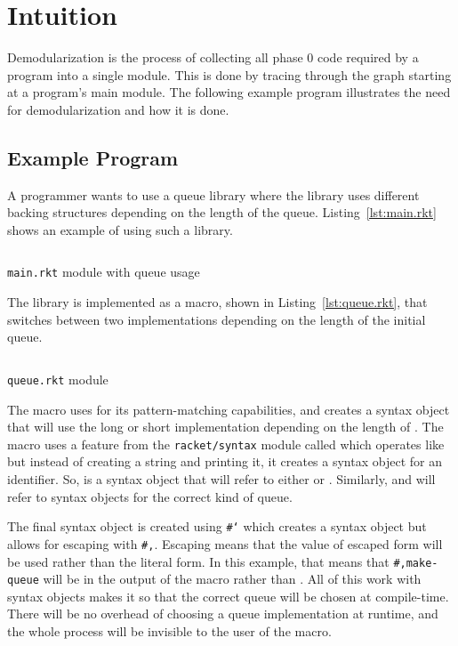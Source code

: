 \chapter{Intuition}
\label{chap:intuition}
Demodularization is the process of collecting all phase 0 code required by a program into a single module.
This is done by tracing through the  graph starting at a program's main module.
The following example program illustrates the need for demodularization and how it is done.

\section{Example Program}
A programmer wants to use a queue library where the library uses different backing structures depending on the length of the queue. 
Listing~\ref{lst:main.rkt} shows an example of using such a library.
\begin{listing}
  \inputminted{racket}{listings/main.rkt}
  \caption{\texttt{main.rkt} module with queue usage}
  \label{lst:main.rkt}
\end{listing}
The library is implemented as a macro, shown in Listing~\ref{lst:queue.rkt}, that switches between two implementations depending on the length of the initial queue.

\begin{listing}
  \inputminted{racket}{listings/queue.rkt}
  \caption{\texttt{queue.rkt} module}
  \label{lst:queue.rkt}
\end{listing}

The macro  uses  for its pattern-matching capabilities, and creates a syntax object that will use the long or short implementation depending on the length of . 
The macro uses a feature from the \texttt{racket/syntax} module called  which operates like  but instead of creating a string and printing it, it creates a syntax object for an identifier. 
So,  is a syntax object that will refer to either  or .
Similarly,  and  will refer to syntax objects for the correct kind of queue.

The final syntax object is created using \texttt{#`} which creates a syntax object but allows for escaping with \texttt{#,}. 
Escaping means that the value of escaped form will be used rather than the literal form. 
In this example, that means that \texttt{#,make-queue} will be  in the output of the macro rather than .
All of this work with syntax objects makes it so that the correct queue will be chosen at compile-time.
There will be no overhead of choosing a queue implementation at runtime, and the whole process will be invisible to the user of the  macro.


